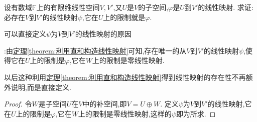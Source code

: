 \documentclass[../../main.tex]{subfiles}%
\begin{document}
\begin{proposition}
设有数域\(\mathbb{F}\)上的有限维线性空间\(V,V'\),又\(U\)是\(V\)的子空间,\(\varphi\)是\(U\)到\(V'\)的线性映射. 求证:必存在\(V\)到\(V'\)的线性映射\(\psi\),它在\(U\)上的限制就是\(\varphi\).
\end{proposition}
\begin{note}
\hypertarget{直接定义\(\psi\)为\(V\)到\(V'\)的线性映射的原因}{可以直接定义\(\psi\)为\(V\)到\(V'\)的线性映射的原因}:由\hyperref[theorem:利用直和构造线性映射]{定理\ref{theorem:利用直和构造线性映射}}可知,存在唯一的从\(V\)到\(V'\)的线性映射\(\psi\),使得它在\(U\)上的限制是\(\varphi\),它在\(W\)上的限制是零线性映射.

以后这种利用\hyperref[theorem:利用直和构造线性映射]{定理\ref{theorem:利用直和构造线性映射}}得到线性映射的存在性不再额外说明,而是直接定义.
\end{note}
\begin{proof}

令\(W\)是子空间\(U\)在\(V\)中的补空间,即\(V = U\oplus W\). \hypertarget{直接定义\(\psi\)为\(V\)到\(V'\)的线性映射的原因}{定义\(\psi\)为\(V\)到\(V'\)的线性映射},它在\(U\)上的限制是\(\varphi\),它在\(W\)上的限制是零线性映射,这样的\(\psi\)即为所求.     

\end{proof}
\end{document}
